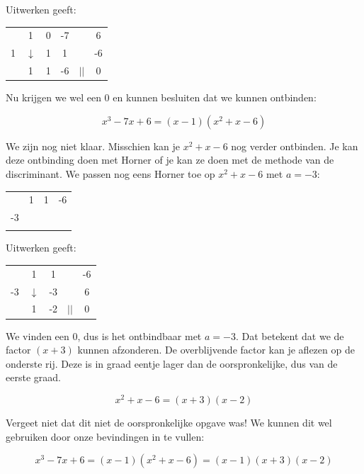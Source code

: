 \begin{voorbeeld}
Uitwerken geeft:

\begin{center}
	\begin{tabular}{c|ccccc}
		& 1 & 0 & -7 & & 6 \\
		1 & $\downarrow$ & 1 & 1 & & -6\\
		\hline 
		& 1 & 1 & -6 & $||$ & 0
	\end{tabular}
\end{center}

Nu krijgen we wel een 0 en kunnen besluiten dat we kunnen ontbinden:

\begin{equation*}
x^3-7x+6=(x-1)(x^2+x-6)
\end{equation*}

We zijn nog niet klaar. Misschien kan je $x^2+x-6$ nog verder ontbinden. Je kan deze ontbinding doen met Horner of je kan ze doen met de methode van de discriminant. We passen nog eens Horner toe op $x^2+x-6$ met $a=-3$:

\begin{center}
	\begin{tabular}{c|ccc}
		& 1 & 1 & -6  \\
		-3 &  &  &  \\
		\hline 
		&  &  &  
	\end{tabular}
\end{center}

Uitwerken geeft:

\begin{center}
	\begin{tabular}{c|cccc}
		& 1 & 1 & & -6 \\
		-3 & $\downarrow$ & -3 & & 6 \\
		\hline 
		& 1 & -2 & $||$  & 0
	\end{tabular}
\end{center}


We vinden een 0, dus is het ontbindbaar met $a=-3$. Dat betekent dat we de factor $(x+3)$ kunnen afzonderen. De overblijvende factor kan je aflezen op de onderste rij. Deze is in graad eentje lager dan de oorspronkelijke, dus van de eerste graad.

\begin{equation*}
x^2+x-6=(x+3)(x-2)
\end{equation*}

Vergeet niet dat dit niet de oorspronkelijke opgave was! We kunnen dit wel gebruiken door onze bevindingen in te vullen:

\begin{equation*}
x^3-7x+6=(x-1)(x^2+x-6)=(x-1)(x+3)(x-2)
\end{equation*}


\end{voorbeeld}
